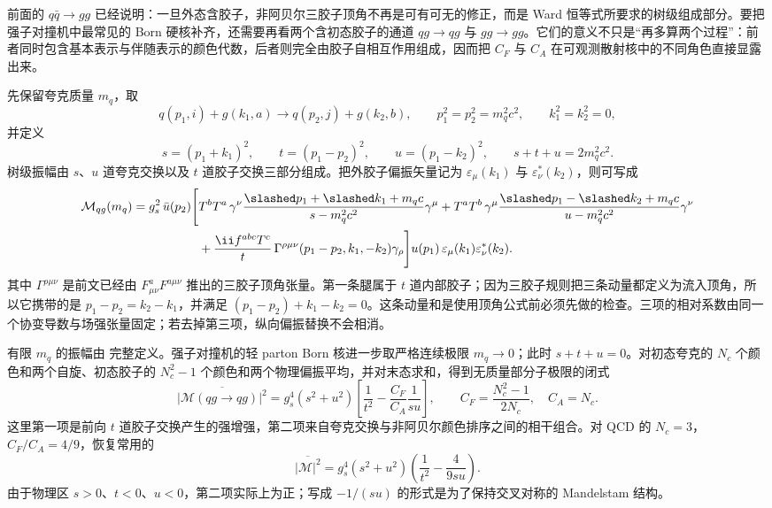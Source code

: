 
前面的 $q\bar q\to gg$ 已经说明：一旦外态含胶子，非阿贝尔三胶子顶角不再是可有可无的修正，而是 Ward 恒等式所要求的树级组成部分。要把强子对撞机中最常见的 Born 硬核补齐，还需要再看两个含初态胶子的通道 $qg\to qg$ 与 $gg\to gg$。它们的意义不只是“再多算两个过程”：前者同时包含基本表示与伴随表示的颜色代数，后者则完全由胶子自相互作用组成，因而把 $C_F$ 与 $C_A$ 在可观测散射核中的不同角色直接显露出来。

先保留夸克质量 $m_q$，取
\begin{equation*}
 q(p_1,i)+g(k_1,a)\to q(p_2,j)+g(k_2,b),
 \qquad
 p_1^2=p_2^2=m_q^2c^2,
 \qquad k_1^2=k_2^2=0,
\end{equation*}
并定义
\begin{equation*}
 s=(p_1+k_1)^2,
 \qquad
 t=(p_1-p_2)^2,
 \qquad
 u=(p_1-k_2)^2,
 \qquad s+t+u=2m_q^2c^2.
\end{equation*}
树级振幅由 $s$、$u$ 道夸克交换以及 $t$ 道胶子交换三部分组成。把外胶子偏振矢量记为 $\varepsilon_\mu(k_1)$ 与 $\varepsilon_\nu^*(k_2)$，则可写成
\begin{equation}
{
\begin{aligned}
\mathcal M_{qg}(m_q)
=g_s^2\,\bar u(p_2)\Bigg[&
 T^bT^a\,\gamma^\nu
 \frac{\slashed p_1+\slashed k_1+m_qc}{s-m_q^2c^2}\gamma^\mu
 +T^aT^b\,\gamma^\mu
 \frac{\slashed p_1-\slashed k_2+m_qc}{u-m_q^2c^2}\gamma^\nu\\
&+\frac{\ii f^{abc}T^c}{t}\,
 \Gamma^{\rho\mu\nu}(p_1-p_2,k_1,-k_2)\gamma_\rho
\Bigg]u(p_1)\,
\varepsilon_\mu(k_1)\varepsilon_\nu^*(k_2).
\end{aligned}}
\label{eq:qcd-qg-amplitude-dp94}
\end{equation}
其中 $\Gamma^{\rho\mu\nu}$ 是前文已经由 $F^a_{\mu\nu}F^{a\mu\nu}$ 推出的三胶子顶角张量。第一条腿属于 $t$ 道内部胶子；因为三胶子规则把三条动量都定义为流入顶角，所以它携带的是 $p_1-p_2=k_2-k_1$，并满足 $(p_1-p_2)+k_1-k_2=0$。这条动量和是使用顶角公式前必须先做的检查。三项的相对系数由同一个协变导数与场强张量固定；若去掉第三项，纵向偏振替换不会相消。

有限 $m_q$ 的振幅由 完整定义。强子对撞机的轻 parton Born 核进一步取严格连续极限 $m_q\to0$；此时 $s+t+u=0$。对初态夸克的 $N_c$ 个颜色和两个自旋、初态胶子的 $N_c^2-1$ 个颜色和两个物理偏振平均，并对末态求和，得到无质量部分子极限的闭式
\begin{equation}
{
\overline{|\mathcal M(qg\to qg)|^2}
=g_s^4(s^2+u^2)
\left[
 \frac1{t^2}-\frac{C_F}{C_A}\frac1{su}
\right],
\qquad
C_F=\frac{N_c^2-1}{2N_c},\quad C_A=N_c.}
\label{eq:qcd-qg-M2-dp94}
\end{equation}
这里第一项是前向 $t$ 道胶子交换产生的强增强，第二项来自夸克交换与非阿贝尔颜色排序之间的相干组合。对 QCD 的 $N_c=3$，$C_F/C_A=4/9$，恢复常用的
\begin{equation*}
 \overline{|\mathcal M|^2}
 =g_s^4(s^2+u^2)
 \left(\frac1{t^2}-\frac{4}{9su}\right).
\end{equation*}
由于物理区 $s>0$、$t<0$、$u<0$，第二项实际上为正；写成 $-1/(su)$ 的形式是为了保持交叉对称的 Mandelstam 结构。

